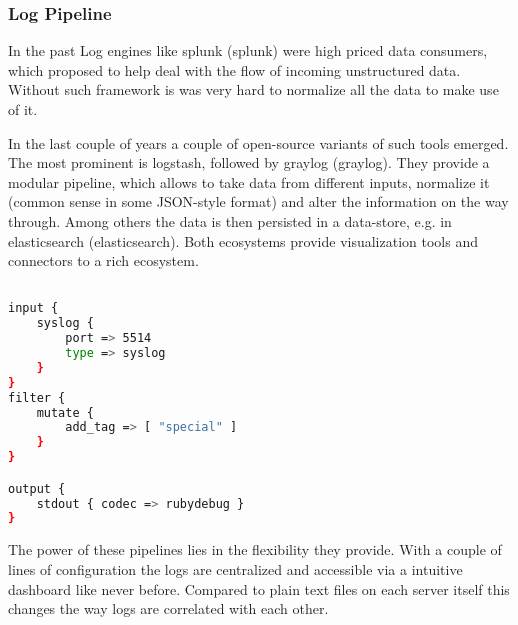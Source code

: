 \subsubsection{Log Pipeline}
In the past Log engines like \gls{splunk} (\glsdesc{splunk}) were high priced data consumers, which proposed to help deal with the
flow of incoming unstructured data. Without such framework is was very hard to normalize all the data to make use of it.

In the last couple of years a couple of open-source variants of such tools emerged. The most prominent is \gls{logstash}, followed by \gls{graylog} (\glsdesc{graylog}).
They provide a modular pipeline, which allows to take data from different inputs, normalize it (common sense in some JSON-style format)
and alter the information on the way through. Among others the data is then persisted in a data-store, e.g. in \gls{elasticsearch} (\glsdesc{elasticsearch}).
Both ecosystems provide visualization tools and connectors to a rich ecosystem.

\begin{lstlisting}[language=bash,label={lst:ls_cfg},
    caption={Basic Logstash configuration}]

input {
    syslog {
        port => 5514
        type => syslog
    }
}
filter {
    mutate {
        add_tag => [ "special" ]
    }
}

output {
    stdout { codec => rubydebug }
}
\end{lstlisting}

The power of these pipelines lies in the flexibility they provide. With a couple of lines of configuration the logs are centralized and accessible
via a intuitive dashboard like never before. Compared to plain text files on each server itself this changes the way logs are correlated with each other.

